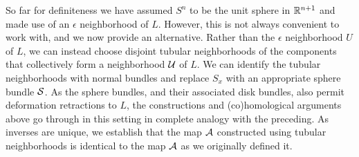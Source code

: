 \begin{example}
\begin{remark}
So far for definiteness we have assumed $S^n$ to be the unit sphere in $\mathbb{R}^{n+1}$ and made use of an $\epsilon$ neighborhood of $L$.
However, this is not always convenient to work with, and we now provide an alternative.
Rather than the $\epsilon$ neighborhood $U$ of $L$, we can instead choose disjoint tubular neighborhoods of the components that collectively form a neighborhood $\mathcal{U}$ of $L$.
We can identify the tubular neighborhoods with normal bundles and replace $S_x$ with an appropriate sphere bundle $\mathcal{S}$.
As the sphere bundles, and their associated disk bundles, also permit deformation retractions to $L$, the constructions and (co)homological arguments above go through in this setting in complete analogy with the preceding.
As inverses are unique, we establish that the map $\mathcal{A}$ constructed using tubular neighborhoods is identical to the map $\mathcal{A}$ as we originally defined it.
\end{remark}




\end{example}